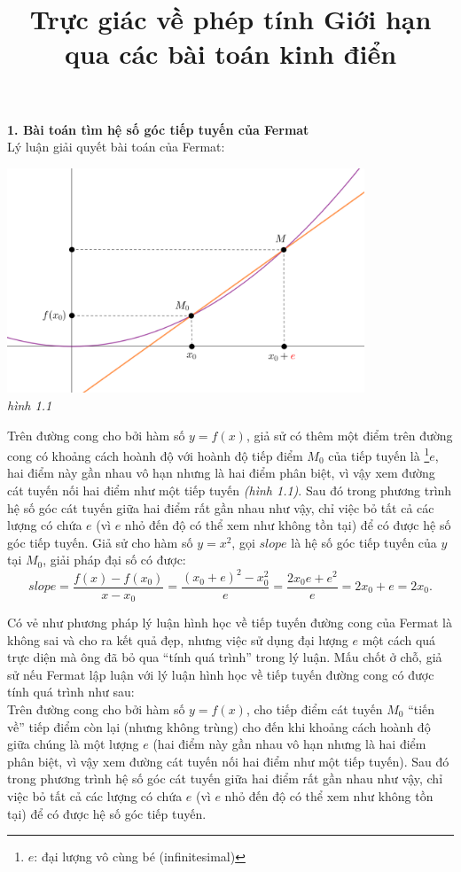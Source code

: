 \documentclass[a4paper,12pt]{article}
\title{\vspace{-8ex} \bfseries Trực giác về phép tính Giới hạn qua các bài toán kinh điển}
\date{\vspace{-8ex}}
\begin{document}
\maketitle
\textbf{1. Bài toán tìm hệ số góc tiếp tuyến của Fermat}\\

Lý luận giải quyết bài toán của Fermat:

\begin{center}
	\includegraphics[width=0.8\textwidth]{fermat}\\
	\textit{hình 1.1}
\end{center}

Trên đường cong cho bởi hàm số $y=f(x)$, giả sử có thêm một điểm trên đường cong có khoảng cách hoành độ với hoành độ tiếp điểm $M_0$ của tiếp tuyến là \footnote{$e$: đại lượng vô cùng bé (infinitesimal)}$e$, hai điểm này gần nhau vô hạn nhưng là hai điểm phân biệt, vì vậy xem đường cát tuyến nối hai điểm như một tiếp tuyến \textit{(hình 1.1)}. Sau đó trong phương trình hệ số góc cát tuyến giữa hai điểm rất gần nhau như vậy, chỉ việc bỏ tất cả các lượng có chứa $e$ (vì $e$ nhỏ đến độ có thể xem như không tồn tại) để có được hệ số góc tiếp tuyến. Giả sử cho hàm số $y=x^2$, gọi $slope$ là hệ số góc tiếp tuyến của $y$ tại $M_0$, giải pháp đại số có được:\\
$$ slope=\frac{f(x)-f(x_0)}{x-x_0} = \frac{(x_0+e)^2-x_0^2}{e}=\frac{2x_0e+e^2}{e}=2x_0+e=2x_0.$$

Có vẻ như phương pháp lý luận hình học về tiếp tuyến đường cong của Fermat là không sai và cho ra kết quả đẹp, nhưng việc sử dụng đại lượng $e$ một cách quá trực diện mà ông đã bỏ qua “tính quá trình” trong lý luận. Mấu chốt ở chỗ, giả sử nếu Fermat lập luận với lý luận hình học về tiếp tuyến đường cong có được tính quá trình như sau:\\

Trên đường cong cho bởi hàm số $y=f(x)$, cho tiếp điểm cát tuyến $M_0$ “tiến về” tiếp điểm còn lại (nhưng không trùng) cho đến khi khoảng cách hoành độ giữa chúng là một lượng $e$ (hai điểm này gần nhau vô hạn nhưng là hai điểm phân biệt, vì vậy xem đường cát tuyến nối hai điểm như một tiếp tuyến). Sau đó trong phương trình hệ số góc cát tuyến giữa hai điểm rất gần nhau như vậy, chỉ việc bỏ tất cả các lượng có chứa $e$ (vì $e$ nhỏ đến độ có thể xem như không tồn tại) để có được hệ số góc tiếp tuyến.\\
\end{document}
